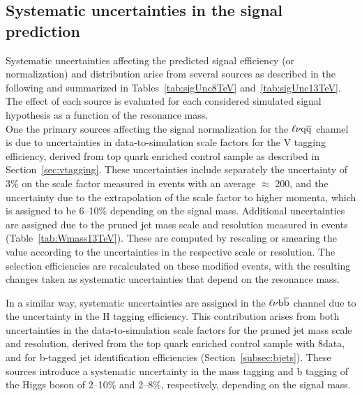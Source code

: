 \subsection{Systematic uncertainties in the signal prediction}\label{subsec:uncSig}

Systematic uncertainties affecting the predicted signal efficiency (or normalization) and \mlvj distribution arise from several sources as described in the following and summarized in Tables~\ref{tab:sigUnc8TeV} and~\ref{tab:sigUnc13TeV}.
The effect of each source is evaluated for each considered simulated signal hypothesis as a function of the resonance mass.\\

One the primary sources affecting the signal normalization for the $\ell\nu\mathrm{q}\overline{\mathrm{q}}$ channel is due to uncertainties in data-to-simulation scale factors for the V tagging efficiency, derived from top quark enriched control sample as described in Section~\ref{sec:vtagging}. These uncertainties include separately the uncertainty of 3\% on the scale factor measured in \ttbar events with an average \pt $\approx$ 200\GeV, and the uncertainty due to the extrapolation of the scale factor to higher momenta, which is assigned to be 6--10\% depending on the signal mass. Additional uncertainties are assigned due to the pruned jet mass scale and resolution measured in \ttbar events (Table~\ref{tab:Wmass13TeV}). These are computed by rescaling or smearing the \mJ value according to the uncertainties in the respective \mJ scale or resolution. The selection efficiencies are recalculated on these modified events, with the resulting changes taken as systematic uncertainties that depend on the resonance mass.

In a similar way, systematic uncertainties are assigned in the $\ell\nu{\mathrm{b}\overline{\mathrm{b}}}$ channel due to the uncertainty in the H tagging efficiency. This contribution arises from both uncertainties in the data-to-simulation scale factors for the pruned jet mass scale and resolution, derived from the top quark enriched control sample with 8\TeV data, and for b-tagged jet identification efficiencies (Section~\ref{subsec:bjets}). These sources introduce a systematic uncertainty in the mass tagging and b tagging of the Higgs boson of 2--10\% and 2--8\%, respectively, depending on the signal mass.\\


